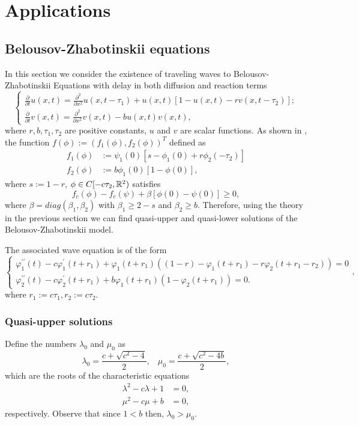 \documentclass[12pt,letterpaper]{amsart}
\theoremstyle{definition}
\theoremstyle{remark}
\numberwithin{equation}{section}
\begin{document}
\section{Applications}\label{applications}

\subsection{Belousov-Zhabotinskii equations}
In this section we consider the
existence of traveling waves to Belousov-Zhabotinskii Equations with delay in both diffusion and reaction terms
\begin{equation}\label{pde-bz}
\begin{cases}
\frac{\partial }{\partial t}u(x,t) = \frac{\partial^2}{\partial
x^2} u(x,t-\tau_1) +u(x,t) [ 1-u(x,t) -r v(x,t-\tau_2)] ;\\
\frac{\partial }{\partial t}v(x,t) = \frac{\partial^2}{\partial x^2}
v(x,t) -bu(x,t)v(x,t) ,
\end{cases}
\end{equation}
where $r,b,  \tau_1,  \tau_2  $ are positive constants, $u$ and $v$ are scalar functions.
As shown in \cite{wuzou}, the function $f(\phi):= (f_1(\phi),f_2(\phi))^T$ defined as
\begin{align}
f_1(\phi)& := \psi_1(0)[s-\phi_1(0)+r\phi_2(-\tau_2)]\\
f_2(\phi)& := b\phi_1(0)[1-\phi(0)],
\end{align}
where $s:=1-r$, $\phi \in C[-c\tau_2,\mathbb R^2)$ satisfies
$$
f_c(\phi )-f_c(\psi )+\beta [\phi(0)-\psi(0)] \ge 0,
$$
where $\beta =diag(\beta_1,\beta_2)$ with $\beta_1\ge 2-s$ and $\beta_2\ge b$. Therefore, using the theory in the previous section we can find quasi-upper and quasi-lower solutions of the Belousov-Zhabotinskii model. 

\medskip
The associated wave equation is of the form
\begin{equation}\label{waveBZ}
\begin{cases}
\varphi_{1}^{\prime\prime}(t)-c\varphi_{1}^{\prime}(t+r_1)+\varphi_{1}(t+r_1)\left(
(1-r)-\varphi_{1}(t+r_1)-r\varphi_{2}(t+r_1-r_2)\right)  =0\\
\varphi_{2}^{\prime\prime}(t)-c\varphi_{2}^{\prime}(t+r_1)+b\varphi_{1}(t+r_1)\left(
1-\varphi_{2}(t+r_1)\right)  =0.
\end{cases},
\end{equation}
where $r_1:=c\tau_1, r_2:=c\tau_2$.

\subsubsection{Quasi-upper solutions}
Define the numbers $\lambda_{0}$ and $\mu_{0}$ as
\[
\lambda_{0}=\frac{c+\sqrt{c^{2}-4}}{2},\;\;\;\mu_{0}=\frac{c+\sqrt{c^{2}-4b}
}{2},
\]
which are the  roots of the characteristic equations
\begin{align}
\lambda^{2}-c\lambda+1&=0, \label{40}\\
\mu^{2}-c\mu+b &=0 \label{41},
\end{align}
respectively. Observe that since
$
1< b
$
then,
$\lambda_{0} > \mu_{0}.
$
\end{document}
